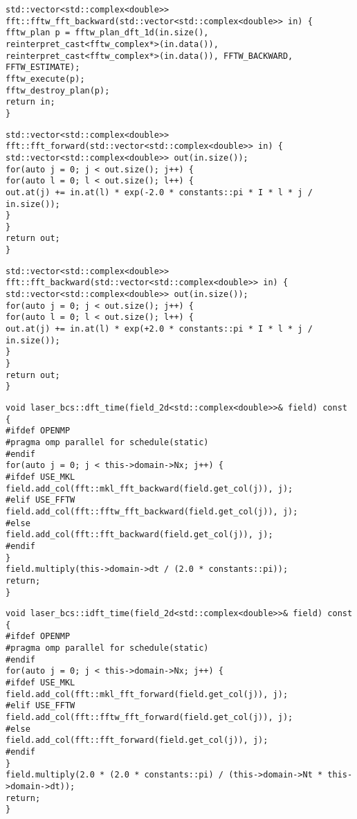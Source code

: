 \begin{lstlisting}[style=CXX, caption=Function performing backward fast Fourier transform using FFTW library]
std::vector<std::complex<double>> fft::fftw_fft_backward(std::vector<std::complex<double>> in) {
fftw_plan p = fftw_plan_dft_1d(in.size(), reinterpret_cast<fftw_complex*>(in.data()), reinterpret_cast<fftw_complex*>(in.data()), FFTW_BACKWARD, FFTW_ESTIMATE);
fftw_execute(p);
fftw_destroy_plan(p);
return in;
}
\end{lstlisting}

\begin{lstlisting}[style=CXX, caption=Function performing forward discrete Fourier transform without using any library]
std::vector<std::complex<double>> fft::fft_forward(std::vector<std::complex<double>> in) {
std::vector<std::complex<double>> out(in.size());
for(auto j = 0; j < out.size(); j++) {
for(auto l = 0; l < out.size(); l++) {
out.at(j) += in.at(l) * exp(-2.0 * constants::pi * I * l * j / in.size());
}
}
return out;
}
\end{lstlisting}

\begin{lstlisting}[style=CXX, caption=Function performing backward discrete Fourier transform without using any library]
std::vector<std::complex<double>> fft::fft_backward(std::vector<std::complex<double>> in) {
std::vector<std::complex<double>> out(in.size());
for(auto j = 0; j < out.size(); j++) {
for(auto l = 0; l < out.size(); l++) {
out.at(j) += in.at(l) * exp(+2.0 * constants::pi * I * l * j / in.size());
}
}
return out;
}
\end{lstlisting}

\begin{lstlisting}[style=CXX, caption=Method for performing discrete Fourier transform in time]
void laser_bcs::dft_time(field_2d<std::complex<double>>& field) const {
#ifdef OPENMP
#pragma omp parallel for schedule(static)
#endif
for(auto j = 0; j < this->domain->Nx; j++) {
#ifdef USE_MKL
field.add_col(fft::mkl_fft_backward(field.get_col(j)), j);
#elif USE_FFTW
field.add_col(fft::fftw_fft_backward(field.get_col(j)), j);
#else
field.add_col(fft::fft_backward(field.get_col(j)), j);
#endif
}
field.multiply(this->domain->dt / (2.0 * constants::pi));
return;
}
\end{lstlisting}

\begin{lstlisting}[style=CXX, caption=Method for performing inverse discrete Fourier transform in time]
void laser_bcs::idft_time(field_2d<std::complex<double>>& field) const {
#ifdef OPENMP
#pragma omp parallel for schedule(static)
#endif
for(auto j = 0; j < this->domain->Nx; j++) {
#ifdef USE_MKL
field.add_col(fft::mkl_fft_forward(field.get_col(j)), j);
#elif USE_FFTW
field.add_col(fft::fftw_fft_forward(field.get_col(j)), j);
#else
field.add_col(fft::fft_forward(field.get_col(j)), j);
#endif
}
field.multiply(2.0 * (2.0 * constants::pi) / (this->domain->Nt * this->domain->dt));
return;
}
\end{lstlisting}

